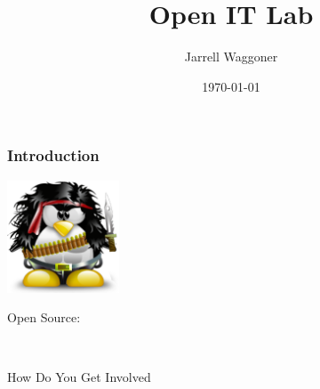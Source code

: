 \documentclass{beamer}
\title[Developers]{Open IT Lab}
\author{Jarrell Waggoner}
\institute[Open IT Lab] {Open IT Lab\\
  \medskip
      {\emph{waggonej@email.sc.edu}} }
\date{\today}
\begin{document}
\rm





\begin{frame}
  \frametitle{Introduction}
  \begin{center}
    \includegraphics[width=0.25\textwidth]{../img/tux-rambo}   

    \vspace{2em}

    \begin{Huge}Open Source:\end{Huge} \\ \begin{LARGE}How Do You Get Involved\end{LARGE}
  \end{center}
\end{frame}
\end{document}
